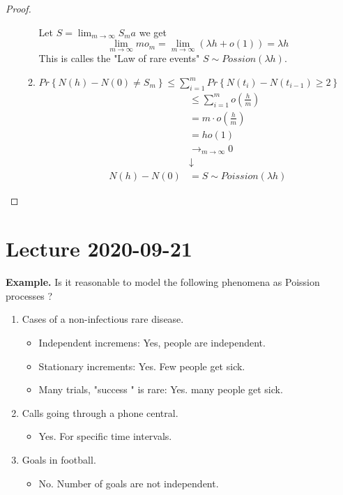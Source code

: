 \documentclass{article}
\theoremstyle{remark}
\newcommand{\newpara}
  {
  \vskip 0.4cm
  }
\begin{document}
\begin{proof}
\begin{itemize}
\begin{enumerate}[label=(\roman*)]
  \newpara
  Let $S = \lim_{m\to  \infty}  S_{m}a $ we get \[
  \lim_{m\to \infty}  mo_{m} = \lim_{m\to \infty}  \left( \lambda h + o \left( 1 \right)  \right) = \lambda h
  \]
  This is calles the "Law of rare events" $S \sim Possion\left( \lambda h \right)$.
\item $ \displaystyle Pr \left \{  N\left( h \right)- N\left( 0 \right)\neq S_{m} \right \}  \le \sum_{i=1}^{m} Pr \left \{ N\left( t_{i} \right) - N\left( t_{i-1} \right) \ge 2 \right \} $ \[
    \begin{split}
      & \le \sum_{i=1}^{m}  o\left( \frac{h}{m} \right) \\
      &= m\cdot o\left( \frac{h}{m} \right) \\
      &= h o\left( 1 \right) \\
       & \to _{m\to \infty} 0 \\
        & \downarrow \\
        N\left( h \right) - N\left( 0 \right)    &  =S \sim Poission \left( \lambda h \right)
    \end{split}
\]

  \end{enumerate}
  \end{itemize}
\end{proof}

\newpage
\section{Lecture 2020-09-21}%
\label{sec:lecture_2020_09_21}

\textbf{Example. } Is it reasonable to model the following phenomena as Poission processes  ?
\begin{enumerate}[label=(\alph*)]
  \item Cases of a non-infectious rare disease.
    \begin{itemize}
      \item Independent incremens: Yes, people are independent.
      \item Stationary increments: Yes. Few people get sick.
      \item Many trials, "success " is rare: Yes. many people get sick.
    \end{itemize}
  \item Calls going through a phone central.
    \begin{itemize}
      \item Yes. For specific time intervals.
    \end{itemize}
  \item Goals in football.
    \begin{itemize}
      \item No. Number of goals are not independent.
    \end{itemize}
\end{enumerate}
\end{document}
